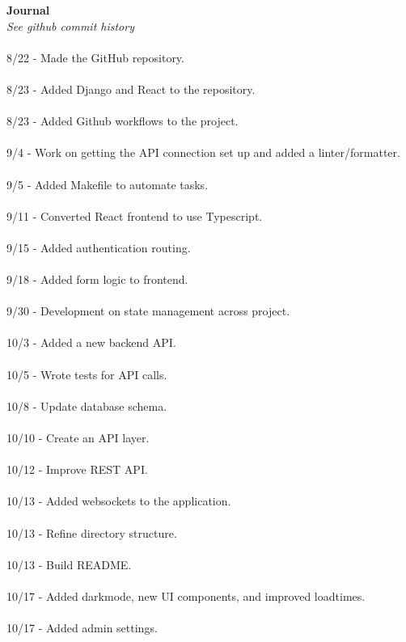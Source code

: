 \documentclass[oneside,openany,obeyspaces]{book}
\begin{document}
\begin{flushleft}
    \textbf{Journal\\}
    \textit{See github commit history}\\~\\
    8/22 - Made the GitHub repository.\\~\\
    8/23 - Added Django and React to the repository.\\~\\
    8/23 - Added Github workflows to the project.\\~\\
    9/4 - Work on getting the API connection set up and added a linter/formatter.\\~\\
    9/5 - Added Makefile to automate tasks.\\~\\
    9/11 - Converted React frontend to use Typescript.\\~\\
    9/15 - Added authentication routing.\\~\\
    9/18 - Added form logic to frontend.\\~\\
    9/30 - Development on state management across project.\\~\\
    10/3 - Added a new backend API.\\~\\
    10/5 - Wrote tests for API calls.\\~\\
    10/8 - Update database schema.\\~\\
    10/10 - Create an API layer.\\~\\
    10/12 - Improve REST API.\\~\\
    10/13 - Added websockets to the application.\\~\\
    10/13 - Refine directory structure.\\~\\
    10/13 - Build README.\\~\\
    10/17 - Added darkmode, new UI components, and improved loadtimes.\\~\\
    10/17 - Added admin settings.\\~\\

\end{flushleft}
\end{document}
